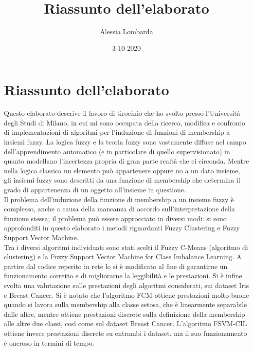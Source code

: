 \documentclass[oneside, openany]{book}
\title{Riassunto dell'elaborato}
\date{3-10-2020}
\author{Alessia Lombarda}
\begin{document}
	\begin{titlepage}
		
	\end{titlepage}
	\chapter*{Riassunto dell'elaborato}
	Questo elaborato descrive il lavoro di tirocinio che ho svolto presso l'Università degli Studi di Milano, in cui mi sono occupata della ricerca, modifica e confronto di implementazioni di algoritmi per l'induzione di funzioni di membership a insiemi fuzzy. La logica fuzzy e la teoria fuzzy sono vastamente diffuse nel campo dell'apprendimento automatico (e in particolare di quello supervisionato) in quanto modellano l'incertezza propria di gran parte realtà che ci circonda. Mentre nella logica classica un elemento può appartenere oppure no a un dato insieme, gli insiemi fuzzy sono descritti da una funzione di membership che determina il grado di appartenenza di un oggetto all'insieme in questione.\\
	Il problema dell'induzione della funzione di membership a un insieme fuzzy è complesso, anche a causa della mancanza di accordo sull'interpretazione della funzione stessa; il problema può essere approcciato in diversi modi: si sono approfonditi in questo elaborato i metodi riguardanti Fuzzy Clustering e Fuzzy Support Vector Machine.\\
	Tra i diversi algoritmi individuati sono stati scelti il Fuzzy C-Means (algoritmo di clustering) e la Fuzzy Support Vector Machine for Class Imbalance Learning. A partire dal codice reperito in rete lo si è modificato al fine di garantirne un funzionamento corretto e di migliorarne la leggibilità e le prestazioni. Si è infine svolta una valutazione sulle prestazioni degli algoritmi considerati, sui dataset Iris e Breast Cancer. Si è notato che l'algoritmo FCM ottiene prestazioni molto buone quando si lavora sulla membership alla classe setosa, che è linearmente separabile dalle altre, mentre ottiene prestazioni discrete sulla definizione della membership alle altre due classi, così come sul dataset Breast Cancer. L'algoritmo FSVM-CIL ottiene invece prestazioni discrete su entrambi i dataset, ma il suo funzionamento è oneroso in termini di tempo.
	
\end{document}
